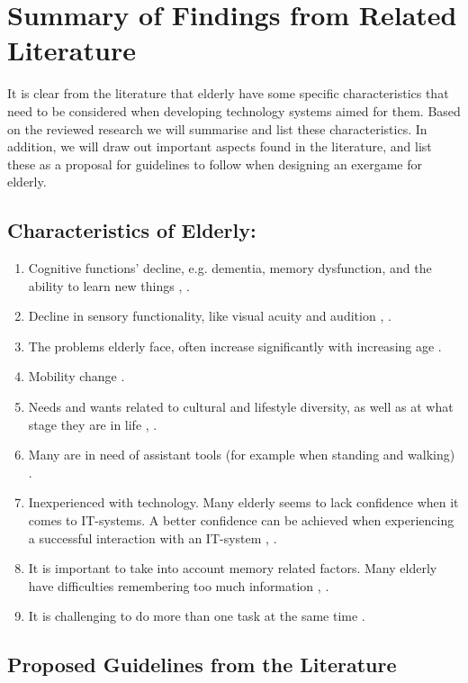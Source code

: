 \section{Summary of Findings from Related Literature}
\label{sec:summaryguidelines}
It is clear from the literature that elderly have some specific characteristics that need to be considered when developing technology systems aimed for them. Based on the reviewed research we will summarise and list these characteristics. In addition, we will draw out important aspects found in the literature, and list these as a proposal for guidelines to follow when designing an exergame for elderly.

\subsection{Characteristics of Elderly:}
\label{subsec:characteristics}
\begin{enumerate}[{c}.1]
\item Cognitive functions' decline, e.g. dementia, memory dysfunction, and the ability to learn new things \cite{Billis}, \cite{gregor}.
\item Decline in sensory functionality, like  visual acuity and audition \cite{Billis}, \cite{gregor}.
\item The problems elderly face, often increase significantly with increasing age \cite{gregor}.
\item Mobility change \cite{Billis}.
\item Needs and wants related to cultural and lifestyle diversity, as well as at what stage they are in life \cite{Billis}, \cite{gregor}.
\item Many are in need of assistant tools (for example when standing and walking) \cite{gregor}.
\item Inexperienced with technology. Many elderly seems to lack confidence when it comes to IT-systems. A better confidence can be achieved when experiencing a successful interaction with an IT-system \cite{Billis}, \cite{gregor}.
\item It is important to take into account memory related factors. Many elderly have difficulties remembering too much information \cite{Billis}, \cite{gregor}.
\item It is challenging to do more than one task at the same time \cite{bruin}.
\end{enumerate}

\subsection{Proposed Guidelines from the Literature}
\label{subsec:guidelines}

